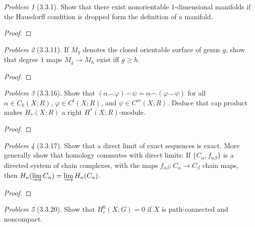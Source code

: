 \documentclass[10pt]{article}
\newcommand{\sk}{\vskip 10mm}
\theoremstyle{remark}
\newtheorem{problem}{Problem}
\begin{document}
\begin{problem}[3.3.1]
  Show that there exist nonorientable $1$-dimensional manifolds if the Hausdorff
  condition is dropped form the definition of a manifold.
\end{problem}

\begin{proof}
  
\end{proof}

\sk

\begin{problem}[3.3.11]
  If $M_g$ denotes the closed orientable surface of genus $g$, show
  that degree $1$ maps $M_g\rightarrow M_h$ exist iff $g\geq h$.
\end{problem}

\begin{proof}
  
\end{proof}

\sk

\begin{problem}[3.3.16]
  Show that
  $(\alpha\smallfrown \varphi)\smallfrown \psi=\alpha\smallfrown (\varphi\smallsmile \psi)$
  for all $\alpha\in C_k(X;R)$, $\varphi\in C^l(X;R)$, and $\psi\in C^m(X;R)$.
  Deduce that cap product makes $H_*(X;R)$ a right $H^*(X;R)$-module.
\end{problem}

\begin{proof}
  
\end{proof}

\sk

\begin{problem}[3.3.17]
  Show that a direct limit of exact sequences is exact. More generally show that
  homology commutes with direct limits: If $\{C_\alpha,f_{\alpha\beta}\}$ is a
  directed system of chain complexes, with the maps
  $f_{\alpha\beta}:C_\alpha\rightarrow C_\beta$ chain maps,
  then $H_n(\varinjlim C_\alpha)=\varinjlim H_n(C_\alpha)$.
\end{problem}

\begin{proof}
  
\end{proof}

\sk

\begin{problem}[3.3.20]
  Show that $H_c^0(X;G)=0$ if $X$ is path-connected and noncompact.
\end{problem}
\end{document}
